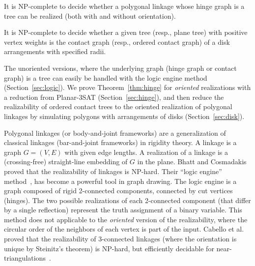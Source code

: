 \documentclass{llncs}
\begin{document}
\begin{theorem}\label{thm:hinge}
It is NP-complete to decide whether a polygonal linkage whose hinge graph is a tree can be realized (both with and without orientation).
\end{theorem}

\begin{theorem}\label{thm:disk}
It is NP-complete to decide whether a given tree (resp., plane tree) with positive vertex weights
is the contact graph (resp., ordered contact graph) of a disk arrangements with specified radii.
\end{theorem}

The unoriented versions, where the underlying graph (hinge graph or contact graph) is a tree can easily be handled with the logic engine method (Section~\ref{sec:logic}). We prove Theorem~\ref{thm:hinge} for \emph{oriented} realizations with a reduction from {\sc Planar-3SAT} (Section~\ref{sec:hinge}), and then reduce the realizability of ordered contact trees to the oriented realization of polygonal linkages by simulating polygons with arrangements of disks (Section~\ref{sec:disk}).

\smallskip{}
Polygonal linkages (or body-and-joint frameworks) are a generalization of classical linkages (bar-and-joint frameworks) in rigidity theory. A linkage is a graph $G=(V,E)$ with given edge lengths. A realization of a linkage is a (crossing-free) straight-line embedding of $G$ in the plane.
Bhatt and Cosmadakis~\cite{BC87} proved that the realizability of linkages is NP-hard.
Their ``logic engine'' method~\cite{SFM+11,BET+99,FHW97,HK01}, has become a powerful tool in graph drawing.
The logic engine is a graph composed of rigid 2-connected components, connected by cut vertices (hinges). The two possible realizations of each 2-connected component (that differ by a single reflection)  represent the truth assignment of a binary variable. This method does not applicable to the \emph{oriented} version of the realizability, where the circular order of the neighbors of each vertex is part of the input. Cabello et al.~\cite{CDR07,EW90} proved that the realizability of 3-connected linkages (where the orientation is unique by Steinitz's theorem) is NP-hard, but efficiently decidable for near-triangulations~\cite{CDR07,BV96}.
\end{document}
